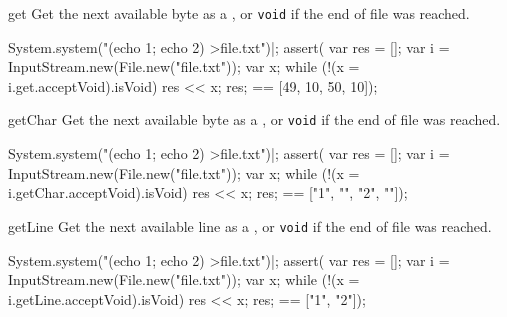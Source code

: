 \begin{urbiscriptapi}
\item[get]
  Get the next available byte as a , or
  \lstinline|void| if the end of file was reached.
\begin{urbiscript}
System.system("(echo 1; echo 2) >file.txt")|;
assert(
  {
    var res = [];
    var i = InputStream.new(File.new("file.txt"));
    var x;
    while (!(x = i.get.acceptVoid).isVoid)
      res << x;
    res;
  }
  ==
  [49, 10, 50, 10]);
\end{urbiscript}

\item[getChar]
  Get the next available byte as a , or
  \lstinline|void| if the end of file was reached.
\begin{urbiscript}
System.system("(echo 1; echo 2) >file.txt")|;
assert(
  {
    var res = [];
    var i = InputStream.new(File.new("file.txt"));
    var x;
    while (!(x = i.getChar.acceptVoid).isVoid)
      res << x;
    res;
  }
  ==
  ["1", "\n", "2", "\n"]);
\end{urbiscript}

\item[getLine]
  Get the next available line as a , or
  \lstinline|void| if the end of file was reached.
\begin{urbiscript}
System.system("(echo 1; echo 2) >file.txt")|;
assert(
  {
    var res = [];
    var i = InputStream.new(File.new("file.txt"));
    var x;
    while (!(x = i.getLine.acceptVoid).isVoid)
      res << x;
    res;
  }
  ==
  ["1", "2"]);
\end{urbiscript}
\end{urbiscriptapi}


